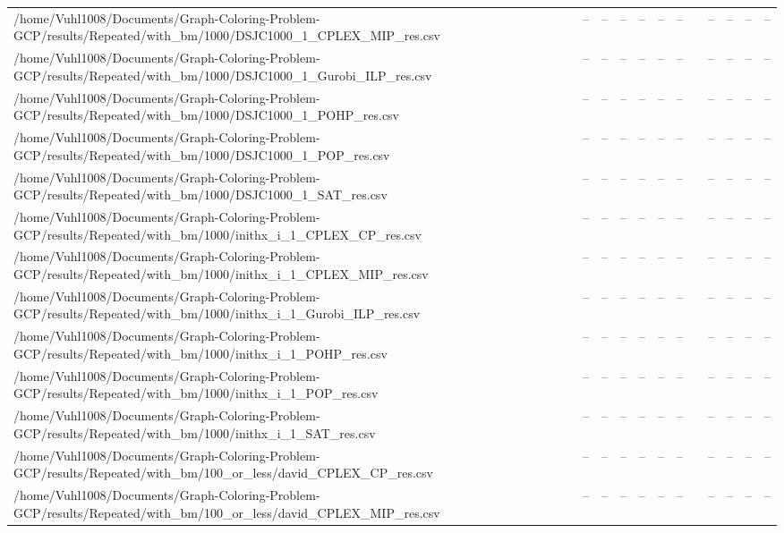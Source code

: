 \begin{table}[htbp]
\begin{tabular}{llllllllllll}
/home/Vuhl1008/Documents/Graph-Coloring-Problem-GCP/results/Repeated/with\_bm/1000/DSJC1000\_1\_CPLEX\_MIP\_res.csv & -- & -- & -- & -- & -- & -- & {} & -- & -- & -- & -- \\
/home/Vuhl1008/Documents/Graph-Coloring-Problem-GCP/results/Repeated/with\_bm/1000/DSJC1000\_1\_Gurobi\_ILP\_res.csv & -- & -- & -- & -- & -- & -- & {} & -- & -- & -- & -- \\
/home/Vuhl1008/Documents/Graph-Coloring-Problem-GCP/results/Repeated/with\_bm/1000/DSJC1000\_1\_POHP\_res.csv & -- & -- & -- & -- & -- & -- & {} & -- & -- & -- & -- \\
/home/Vuhl1008/Documents/Graph-Coloring-Problem-GCP/results/Repeated/with\_bm/1000/DSJC1000\_1\_POP\_res.csv & -- & -- & -- & -- & -- & -- & {} & -- & -- & -- & -- \\
/home/Vuhl1008/Documents/Graph-Coloring-Problem-GCP/results/Repeated/with\_bm/1000/DSJC1000\_1\_SAT\_res.csv & -- & -- & -- & -- & -- & -- & {} & -- & -- & -- & -- \\
/home/Vuhl1008/Documents/Graph-Coloring-Problem-GCP/results/Repeated/with\_bm/1000/inithx\_i\_1\_CPLEX\_CP\_res.csv & -- & -- & -- & -- & -- & -- & {} & -- & -- & -- & -- \\
/home/Vuhl1008/Documents/Graph-Coloring-Problem-GCP/results/Repeated/with\_bm/1000/inithx\_i\_1\_CPLEX\_MIP\_res.csv & -- & -- & -- & -- & -- & -- & {} & -- & -- & -- & -- \\
/home/Vuhl1008/Documents/Graph-Coloring-Problem-GCP/results/Repeated/with\_bm/1000/inithx\_i\_1\_Gurobi\_ILP\_res.csv & -- & -- & -- & -- & -- & -- & {} & -- & -- & -- & -- \\
/home/Vuhl1008/Documents/Graph-Coloring-Problem-GCP/results/Repeated/with\_bm/1000/inithx\_i\_1\_POHP\_res.csv & -- & -- & -- & -- & -- & -- & {} & -- & -- & -- & -- \\
/home/Vuhl1008/Documents/Graph-Coloring-Problem-GCP/results/Repeated/with\_bm/1000/inithx\_i\_1\_POP\_res.csv & -- & -- & -- & -- & -- & -- & {} & -- & -- & -- & -- \\
/home/Vuhl1008/Documents/Graph-Coloring-Problem-GCP/results/Repeated/with\_bm/1000/inithx\_i\_1\_SAT\_res.csv & -- & -- & -- & -- & -- & -- & {} & -- & -- & -- & -- \\
/home/Vuhl1008/Documents/Graph-Coloring-Problem-GCP/results/Repeated/with\_bm/100\_or\_less/david\_CPLEX\_CP\_res.csv & -- & -- & -- & -- & -- & -- & {} & -- & -- & -- & -- \\
/home/Vuhl1008/Documents/Graph-Coloring-Problem-GCP/results/Repeated/with\_bm/100\_or\_less/david\_CPLEX\_MIP\_res.csv & -- & -- & -- & -- & -- & -- & {} & -- & -- & -- & -- \\

\end{tabular}
\end{table}
